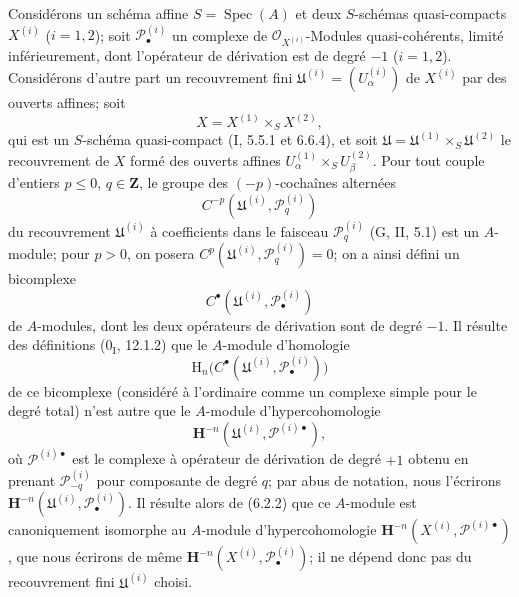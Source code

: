\begin{env}[6.6.1]
Considérons un schéma affine $S=\operatorname{Spec}(A)$ et deux $S$-schémas
quasi-compacts $X^{(i)}$ ($i=1,2$); soit $\mathscr P_\bullet^{(i)}$ un complexe
de $\mathscr O_{X^{(i)}}$-Modules quasi-cohérents, limité inférieurement, dont
l'opérateur de dérivation est de degré $-1$ ($i=1,2$). Considérons d'autre
part un recouvrement fini
$\mathfrak U^{(i)}=(U_\alpha^{(i)})$ de $X^{(i)}$ par des ouverts affines;
soit
\[
  X=X^{(1)}\times_S X^{(2)},
\]
qui est un $S$-schéma quasi-compact (I, 5.5.1 et 6.6.4), et soit
$\mathfrak U=\mathfrak U^{(1)}\times_S\mathfrak U^{(2)}$ le recouvrement de
$X$ formé des ouverts affines
$U_\alpha^{(1)}\times_S U_\beta^{(2)}$. Pour tout couple d'entiers
$p\leqslant0$, $q\in\mathbf Z$, le groupe des $(-p)$-cochaînes alternées
\[
  C^{-p}(\mathfrak U^{(i)},\mathscr P_q^{(i)})
\]
du recouvrement $\mathfrak U^{(i)}$ à coefficients dans le faisceau
$\mathscr P_q^{(i)}$ (G, II, 5.1) est un $A$-module; pour $p>0$, on posera
$C^p(\mathfrak U^{(i)},\mathscr P_q^{(i)})=0$; on a ainsi défini un
bicomplexe
\[
  C^\bullet(\mathfrak U^{(i)},\mathscr P_\bullet^{(i)})
\]
de $A$-modules, dont les deux opérateurs de dérivation sont de degré $-1$. Il
résulte des définitions ($0_{\mathrm I}$, 12.1.2) que le $A$-module
d'homologie
\[
  \mathrm H_n\bigl(C^\bullet
  (\mathfrak U^{(i)},\mathscr P_\bullet^{(i)})\bigr)
\]
de ce bicomplexe (considéré à l'ordinaire comme un complexe simple pour le
degré total) n'est autre que le $A$-module d'hypercohomologie
\[
  \mathbf H^{-n}
  (\mathfrak U^{(i)},\mathscr P^{(i)\bullet}),
\]
où $\mathscr P^{(i)\bullet}$ est le complexe à opérateur de dérivation de
degré $+1$ obtenu en prenant $\mathscr P_{-q}^{(i)}$ pour composante de degré
$q$; par abus de notation, nous l'écrirons
$\mathbf H^{-n}(\mathfrak U^{(i)},\mathscr P_\bullet^{(i)})$. Il résulte alors
de (6.2.2) que ce $A$-module est canoniquement isomorphe au $A$-module
d'hypercohomologie
$\mathbf H^{-n}(X^{(i)},\mathscr P^{(i)\bullet})$, que nous écrirons de même
$\mathbf H^{-n}(X^{(i)},\mathscr P_\bullet^{(i)})$; il ne dépend donc pas du
recouvrement fini $\mathfrak U^{(i)}$ choisi.
\end{env}

